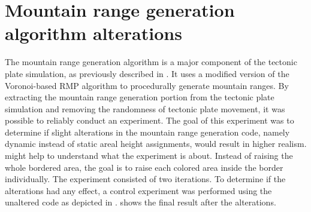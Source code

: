 \documentclass[11pt,a4paper,twoside,openright]{report}
\begin{document}
\section[Mountain range generation algorithm alterations]{Mountain range generation algorithm alterations%
}
The mountain range generation algorithm is a major component of the tectonic plate simulation, as previously described in . It uses a modified version of the Voronoi-based RMP algorithm to procedurally generate mountain ranges. By extracting the mountain range generation portion from the tectonic plate simulation and removing the randomness of tectonic plate movement, it was possible to reliably conduct an experiment. The goal of this experiment was to determine if slight alterations in the mountain range generation code, namely dynamic instead of static areal height assignments, would result in higher realism.  might help to understand what the experiment is about. Instead of raising the whole bordered area, the goal is to raise each colored area inside the border individually. The experiment consisted of two iterations. To determine if the alterations had any effect, a control experiment was performed using the unaltered code as depicted in .  shows the final result after the alterations.
\end{document}
